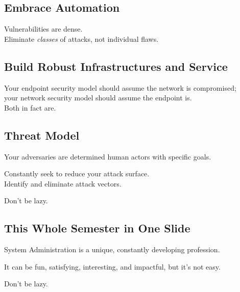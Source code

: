 \documentclass[xga]{xdvislides}
\begin{document}
\subsection{Embrace Automation}
\vspace*{\fill}
\Huge
\begin{center}
	Vulnerabilities are dense. \\
\addvspace{.5in}
	Eliminate {\em classes} of attacks, not
	individual flaws. \\
\end{center}
\Normalsize
\vspace*{\fill}

\subsection{Build Robust Infrastructures and Service}
\vspace*{\fill}
\Huge
\begin{center}
	Your endpoint security model should assume the
	network is compromised; \\
	your network security model should assume the
	endpoint is. \\
\addvspace{.5in}
	Both in fact are.
\end{center}
\Normalsize
\vspace*{\fill}

\subsection{Threat Model}
\vspace*{\fill}
\Huge
\begin{center}
Your adversaries are determined human actors with
specific goals. \\
\addvspace{.5in}

Constantly seek to reduce your attack surface. \\
Identify and eliminate attack vectors.\\
\addvspace{.5in}

Don't be lazy.
\end{center}
\Normalsize
\vspace*{\fill}

\subsection{This Whole Semester in One Slide}
\vspace*{\fill}
\Huge
\begin{center}
System Administration is a unique, constantly
developing profession. \\
\vspace{.5in}

It can be fun, satisfying, interesting, and impactful,
but it's not easy. \\
\vspace{.5in}

Don't be lazy.
\end{center}
\Normalsize
\vspace*{\fill}
\end{document}
